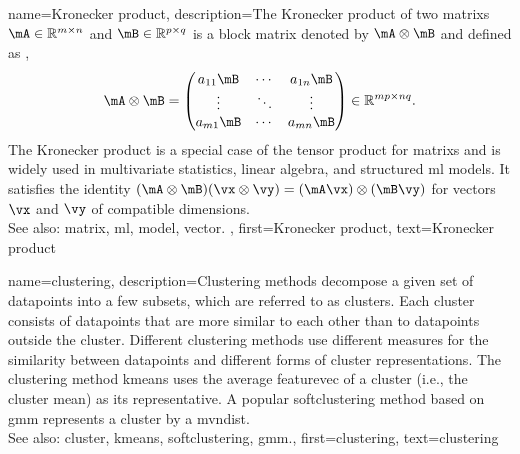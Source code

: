 {name={Kronecker product}, 
	description={The Kronecker product of two \glspl{matrix} $\mA \in \mathbb{R}^{m \times n}$ 
		and $\mB \in \mathbb{R}^{p \times q}$ is a block \gls{matrix} denoted by $\mA \otimes \mB$ 
	 	and defined as \cite{GolubVanLoanBook}, \cite{HornMatAnalysis}
    		\[
      		\mA \otimes \mB =
      		\begin{pmatrix}
        		a_{11}\mB & \cdots & a_{1n}\mB \\
        		\vdots & \ddots & \vdots \\
        		a_{m1}\mB & \cdots & a_{mn}\mB
      		\end{pmatrix}
      		\in \mathbb{R}^{mp \times nq}.
    		\]
    		The Kronecker product is a special case of the tensor product for \glspl{matrix} and is 
		widely used in multivariate statistics, linear algebra, and structured \gls{ml} \glspl{model}. 
		It satisfies the identity $(\mA \otimes \mB)(\vx \otimes \vy) = (\mA\vx) \otimes (\mB\vy)$ 
		for \glspl{vector} $\vx$ and $\vy$ of compatible dimensions.
		\\
		See also: \gls{matrix}, \gls{ml}, \gls{model}, \gls{vector}. },
	first={Kronecker product},
	text={Kronecker product} 
}
	
{name={clustering}, 
	description={Clustering methods decompose a given 
		set of \glspl{datapoint} into a few subsets, which are referred to as \glspl{cluster}. 
		Each \gls{cluster} consists of \glspl{datapoint} that are more similar to each 
		other than to \glspl{datapoint} outside the \gls{cluster}. Different clustering methods 
		use different \glspl{measure} for the similarity between \glspl{datapoint} and different 
		forms of \gls{cluster} representations. The clustering method \gls{kmeans} uses the 
		average \gls{featurevec} of a \gls{cluster} (i.e., the \gls{cluster} \gls{mean}) as its representative. 
		A popular \gls{softclustering} method based on \gls{gmm} represents 
		a \gls{cluster} by a \gls{mvndist}.
				\\
		See also: \gls{cluster}, \gls{kmeans}, \gls{softclustering}, \gls{gmm}.},
	first={clustering},
	text={clustering} 
}
	
